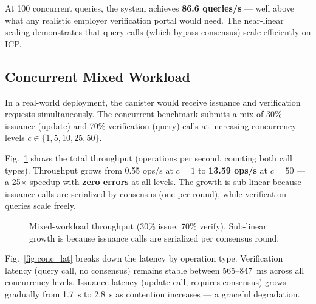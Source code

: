 \documentclass[conference]{IEEEtran}
\begin{document}
At 100 concurrent queries, the system achieves \textbf{86.6 queries/s} — well above what any realistic employer verification portal would need. The near-linear scaling demonstrates that query calls (which bypass consensus) scale efficiently on ICP.

\subsection{Concurrent Mixed Workload}

In a real-world deployment, the canister would receive issuance and verification requests simultaneously. The concurrent benchmark submits a mix of 30\% issuance (update) and 70\% verification (query) calls at increasing concurrency levels $c \in \{1, 5, 10, 25, 50\}$.

Fig.~\ref{fig:conc_tput} shows the total throughput (operations per second, counting both call types). Throughput grows from 0.55 ops/s at $c = 1$ to \textbf{13.59 ops/s} at $c = 50$ — a 25$\times$ speedup with \textbf{zero errors} at all levels. The growth is sub-linear because issuance calls are serialized by consensus (one per round), while verification queries scale freely.

\begin{figure}[t]
\centering
{}
\caption{Mixed-workload throughput (30\% issue, 70\% verify). Sub-linear growth is because issuance calls are serialized per consensus round.}
\label{fig:conc_tput}
\end{figure}

Fig.~\ref{fig:conc_lat} breaks down the latency by operation type. Verification latency (query call, no consensus) remains stable between 565--847~ms across all concurrency levels. Issuance latency (update call, requires consensus) grows gradually from 1.7~s to 2.8~s as contention increases — a graceful degradation.
\end{document}
